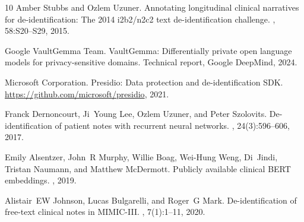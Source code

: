 \documentclass[11pt,a4paper]{article}
\begin{document}
\begin{thebibliography}{10}
Amber Stubbs and Ozlem Uzuner.
\newblock Annotating longitudinal clinical narratives for de-identification: The 2014 i2b2/n2c2 text de-identification challenge.
, 58:S20--S29, 2015.

{Google VaultGemma Team}.
\newblock VaultGemma: Differentially private open language models for privacy-sensitive domains.
\newblock Technical report, Google DeepMind, 2024.

{Microsoft Corporation}.
\newblock Presidio: Data protection and de-identification {SDK}.
\newblock \url{https://github.com/microsoft/presidio}, 2021.

Franck Dernoncourt, Ji~Young Lee, Ozlem Uzuner, and Peter Szolovits.
\newblock De-identification of patient notes with recurrent neural networks.
, 24(3):596--606, 2017.

Emily Alsentzer, John~R Murphy, Willie Boag, Wei-Hung Weng, Di~Jindi, Tristan Naumann, and Matthew McDermott.
\newblock Publicly available clinical {BERT} embeddings.
, 2019.

Alistair~EW Johnson, Lucas Bulgarelli, and Roger~G Mark.
\newblock De-identification of free-text clinical notes in {MIMIC-III}.
, 7(1):1--11, 2020.

\end{thebibliography}
\end{document}
